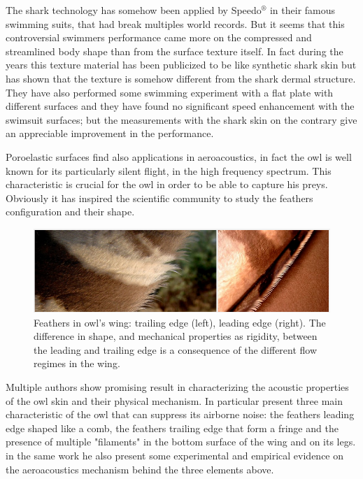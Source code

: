 The shark technology has somehow been applied by Speedo$^{\circledR}$ in their famous swimming suits, that had break multiples world records.
But it seems that this controversial swimmers performance came more on the compressed and streamlined body shape than from the surface texture itself.
In fact during the years this texture material has been publicized to be like synthetic shark skin but \cite{Oeffner785} has shown that the texture is somehow different from the shark dermal structure.
They have also performed some swimming experiment with a flat plate with different surfaces and they have found no significant speed enhancement with the swimsuit surfaces; but the measurements with the shark skin on the contrary give an appreciable improvement in the performance.


Poroelastic surfaces find also applications in aeroacoustics, in fact the owl is well known for its particularly silent flight, in the high frequency spectrum.
This characteristic is crucial for the owl in order to be able to capture his preys.
Obviously it has inspired the scientific community to study the feathers configuration and their shape.

\begin{figure}[h]
	\centering
	\includegraphics[width=0.8\linewidth]{chapter_1/howl}
	\caption{Feathers in owl's wing: trailing edge (left), leading edge (right). The difference in shape, and mechanical properties as rigidity, between the leading and trailing edge is a consequence of the different flow regimes in the wing.}
	\label{fig:owl}
\end{figure}
 
Multiple authors show promising result in characterizing the acoustic properties of the owl skin and their physical mechanism.
In particular \cite{lilley1998} present three main characteristic of the owl that can suppress its airborne noise: the feathers leading edge shaped like a comb, the feathers trailing edge that form a fringe and the presence of multiple "filaments" in the bottom surface of the wing and on its legs.
in the same work he also present some experimental and empirical evidence on the aeroacoustics mechanism behind the three elements above.

